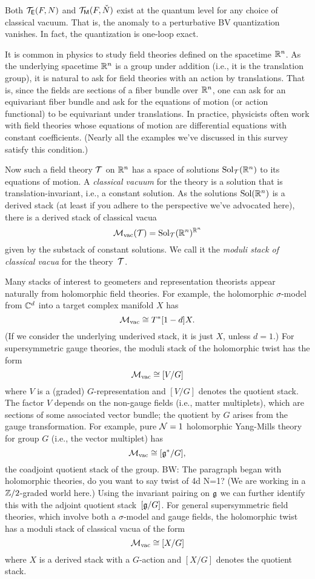 \documentclass[11pt]{amsart}
\def\Sol{\text{Sol}}
\def\brian#1{{\textcolor{blue!65!red}{BW: {#1}}}}
\begin{document}
\begin{thm}
Both $\mathcal T_{\mathsf E}(F,N)$ and $\mathcal T_{{\sf M}}(F, \check{N})$ exist at the quantum level for any choice of classical vacuum. 
That is, the anomaly to a perturbative BV quantization vanishes.
In fact, the quantization is one-loop exact. 
\end{thm}

It is common in physics to study field theories defined on the spacetime $\mathbb R^n$.
As the underlying spacetime $\mathbb R^n$ is a group under addition (i.e., it is the translation group),
it is natural to ask for field theories with an action by translations.
That is, since the fields are sections of a fiber bundle over $\mathbb R^n$,
one can ask for an equivariant fiber bundle and ask for the equations of motion (or action functional) to be equivariant under translations.
In practice, physicists often work with field theories whose equations of motion are differential equations with constant coefficients.
(Nearly all the examples we've discussed in this survey satisfy this condition.)

Now such a field theory $\mathcal T$ on $\mathbb R^n$ has a space of solutions $\Sol_\cT(\RR^n)$ to its equations of motion.
A {\em classical vacuum} for the theory is a solution that is translation-invariant,
i.e., a constant solution.
As the solutions $\Sol(\RR^n)$ is a derived stack (at least if you adhere to the perspective we've advocated here), there is a derived stack of classical vacua
\[
\cM_{\rm vac}(\cT) = \Sol_\cT(\RR^n)^{\RR^n}
\]
given by the substack of constant solutions.
We call it the {\em moduli stack of classical vacua} for the theory~$\mathcal T$.

Many stacks of interest to geometers and representation theorists appear naturally from holomorphic field theories.
For example, the holomorphic $\sigma$-model from $\mathbb C^d$ into a target complex manifold $X$ has
\[
\mathcal M_{\rm vac} \cong T^*[1-d]X.
\]
(If we consider the underlying underived stack, it is just $X$, unless $d = 1$.)
For supersymmetric gauge theories, the moduli stack of the holomorphic twist has the form
\[
\mathcal M_{\rm vac} \cong [V/G]
\]
where $V$ is a (graded) $G$-representation and $[V/G]$ denotes the quotient stack.
The factor $V$ depends on the non-gauge fields (i.e., matter multiplets), which are sections of some associated vector bundle;
the quotient by $G$ arises from the gauge transformation.
For example, pure $\mathcal N =1$ holomorphic Yang-Mills theory for group $G$ (i.e., the vector multiplet) has
\[
\mathcal M_{\rm vac} \cong [\mathfrak g^*/G],
\]
the coadjoint quotient stack of the group.
\brian{The paragraph began with holomorphic theories, do you want to say twist of 4d N=1?}
(We are working in a $\mathbb Z/2$-graded world here.)
Using the invariant pairing on $\mathfrak g$ we can further identify this with the adjoint quotient stack~$[\mathfrak g / G]$. 
For general supersymmetric field theories, which involve both a $\sigma$-model and gauge fields, the holomorphic twist has a moduli stack of classical vacua of the form
\[
\mathcal M_{\rm vac} \cong [X/G]
\]
where $X$ is a derived stack with a $G$-action and $[X/G]$ denotes the quotient stack.
\end{document}
